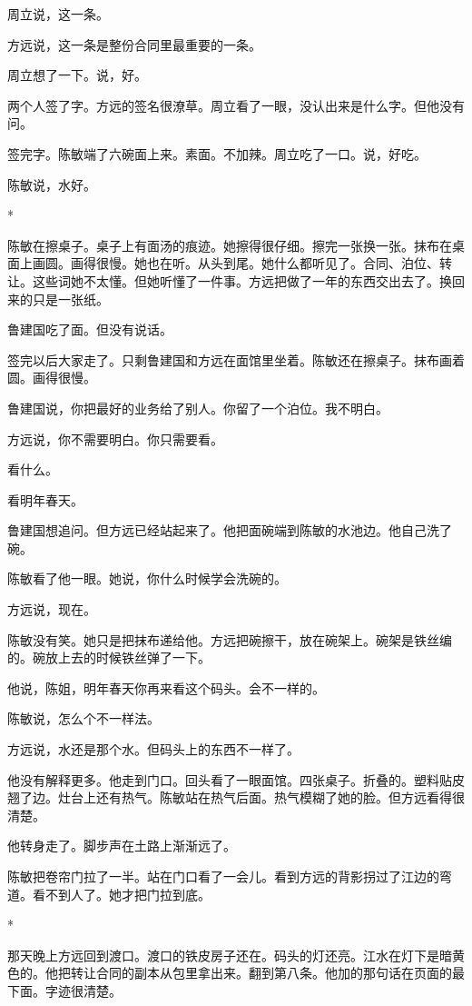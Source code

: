 \documentclass[UTF8,a5paper,11pt,openany]{ctexbook}
\newcommand{\scene}{\vspace{1em}\begin{center}*\quad*\quad*\end{center}\vspace{0.5em}}
\begin{document}
周立说，这一条。

方远说，这一条是整份合同里最重要的一条。

周立想了一下。说，好。

两个人签了字。方远的签名很潦草。周立看了一眼，没认出来是什么字。但他没有问。

签完字。陈敏端了六碗面上来。素面。不加辣。周立吃了一口。说，好吃。

陈敏说，水好。


\scene

陈敏在擦桌子。桌子上有面汤的痕迹。她擦得很仔细。擦完一张换一张。抹布在桌面上画圆。画得很慢。她也在听。从头到尾。她什么都听见了。合同、泊位、转让。这些词她不太懂。但她听懂了一件事。方远把做了一年的东西交出去了。换回来的只是一张纸。

鲁建国吃了面。但没有说话。

签完以后大家走了。只剩鲁建国和方远在面馆里坐着。陈敏还在擦桌子。抹布画着圆。画得很慢。

鲁建国说，你把最好的业务给了别人。你留了一个泊位。我不明白。

方远说，你不需要明白。你只需要看。

看什么。

看明年春天。

鲁建国想追问。但方远已经站起来了。他把面碗端到陈敏的水池边。他自己洗了碗。

陈敏看了他一眼。她说，你什么时候学会洗碗的。

方远说，现在。

陈敏没有笑。她只是把抹布递给他。方远把碗擦干，放在碗架上。碗架是铁丝编的。碗放上去的时候铁丝弹了一下。

他说，陈姐，明年春天你再来看这个码头。会不一样的。

陈敏说，怎么个不一样法。

方远说，水还是那个水。但码头上的东西不一样了。

他没有解释更多。他走到门口。回头看了一眼面馆。四张桌子。折叠的。塑料贴皮翘了边。灶台上还有热气。陈敏站在热气后面。热气模糊了她的脸。但方远看得很清楚。

他转身走了。脚步声在土路上渐渐远了。

陈敏把卷帘门拉了一半。站在门口看了一会儿。看到方远的背影拐过了江边的弯道。看不到人了。她才把门拉到底。


\scene

那天晚上方远回到渡口。渡口的铁皮房子还在。码头的灯还亮。江水在灯下是暗黄色的。他把转让合同的副本从包里拿出来。翻到第八条。他加的那句话在页面的最下面。字迹很清楚。
\end{document}
